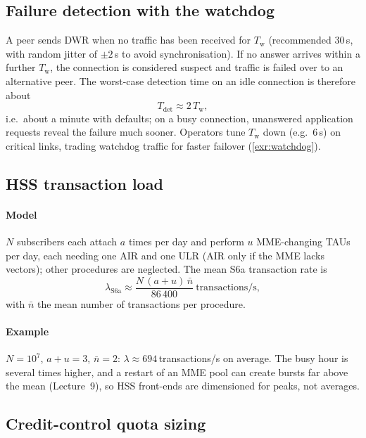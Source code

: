 \documentclass[11pt,a4paper]{article}
\begin{document}
\subsection{Failure detection with the watchdog}\label{sec:watchdog}
A peer sends DWR when no traffic has been received for $T_\mathrm{w}$ (recommended 30\,s, with random jitter
of $\pm2$\,s to avoid synchronisation). If no answer arrives within a further $T_\mathrm{w}$, the connection
is considered suspect and traffic is failed over to an alternative peer. The worst-case detection time on
an idle connection is therefore about
\begin{equation}\label{eq:tdet}
  T_{\mathrm{det}} \approx 2\,T_\mathrm{w},
\end{equation}
i.e.\ about a minute with defaults; on a busy connection, unanswered application requests reveal the failure
much sooner. Operators tune $T_\mathrm{w}$ down (e.g.\ 6\,s) on critical links, trading watchdog traffic for
faster failover (\cref{exr:watchdog}).

\subsection{HSS transaction load}\label{sec:hssload}
\paragraph{Model} $N$ subscribers each attach $a$ times per day and perform $u$ MME-changing TAUs per day,
each needing one AIR and one ULR (AIR only if the MME lacks vectors); other procedures are neglected. The
mean S6a transaction rate is
\begin{equation}\label{eq:hss}
  \lambda_{\mathrm{S6a}} \approx \frac{N\,(a+u)\,\bar n}{86\,400}\ \text{transactions/s},
\end{equation}
with $\bar n$ the mean number of transactions per procedure.
\paragraph{Example} $N = 10^7$, $a+u = 3$, $\bar n = 2$: $\lambda \approx 694$\,transactions/s on average. The
busy hour is several times higher, and a restart of an MME pool can create bursts far above the mean
(Lecture~9), so HSS front-ends are dimensioned for peaks, not averages.

\subsection{Credit-control quota sizing}\label{sec:quota}
\end{document}
